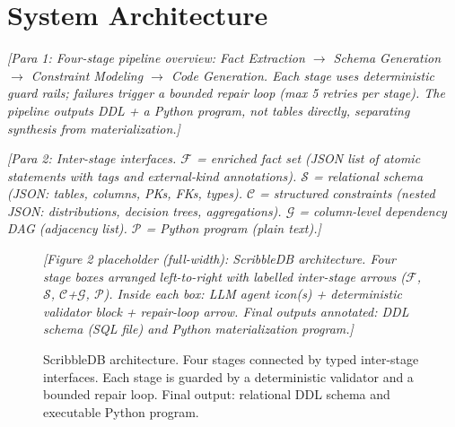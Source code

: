 \section{System Architecture}

\textit{[Para 1: Four-stage pipeline overview: Fact Extraction $\to$ Schema Generation $\to$
Constraint Modeling $\to$ Code Generation.
Each stage uses deterministic guard rails; failures trigger a bounded repair loop
(max 5 retries per stage).
The pipeline outputs DDL + a Python program, not tables directly, separating synthesis
from materialization.]}

\textit{[Para 2: Inter-stage interfaces. $\mathcal{F}$ = enriched fact set (JSON list of
atomic statements with tags and external-kind annotations). $\mathcal{S}$ = relational schema
(JSON: tables, columns, PKs, FKs, types). $\mathcal{C}$ = structured constraints (nested
JSON: distributions, decision trees, aggregations). $\mathcal{G}$ = column-level dependency
DAG (adjacency list). $\mathcal{P}$ = Python program (plain text).]}

\begin{figure}[t]
  \centering
  \vspace{2.5cm}
  \textit{[Figure 2 placeholder (full-width): ScribbleDB architecture.
  Four stage boxes arranged left-to-right with labelled inter-stage arrows
  ($\mathcal{F}$, $\mathcal{S}$, $\mathcal{C}$+$\mathcal{G}$, $\mathcal{P}$).
  Inside each box: LLM agent icon(s) + deterministic validator block + repair-loop arrow.
  Final outputs annotated: DDL schema (SQL file) and Python materialization program.]}
  \vspace{2.5cm}
  \caption{ScribbleDB architecture. Four stages connected by typed inter-stage interfaces.
           Each stage is guarded by a deterministic validator and a bounded repair loop.
           Final output: relational DDL schema and executable Python program.}
  \label{fig:architecture}
\end{figure}
